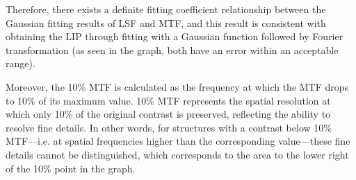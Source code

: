 \documentclass[12pt, a4paper, oneside]{ctexart}
\begin{document}
Therefore, there exists a definite fitting coefficient relationship between the Gaussian fitting results of LSF and MTF, and this result is consistent with obtaining the LIP through fitting with a Gaussian function followed by Fourier transformation (as seen in the graph, both have an error within an acceptable range).

Moreover, the 10\% MTF is calculated as the frequency at which the MTF drops to 10\% of its maximum value. 10\% MTF represents the spatial resolution at which only 10\% of the original contrast is preserved, reflecting the ability to resolve fine details. In other words, for structures with a contrast below 10\% MTF—i.e. at spatial frequencies higher than the corresponding value—these fine details cannot be distinguished, which corresponds to the area to the lower right of the 10\% point in the graph.



\end{document}
